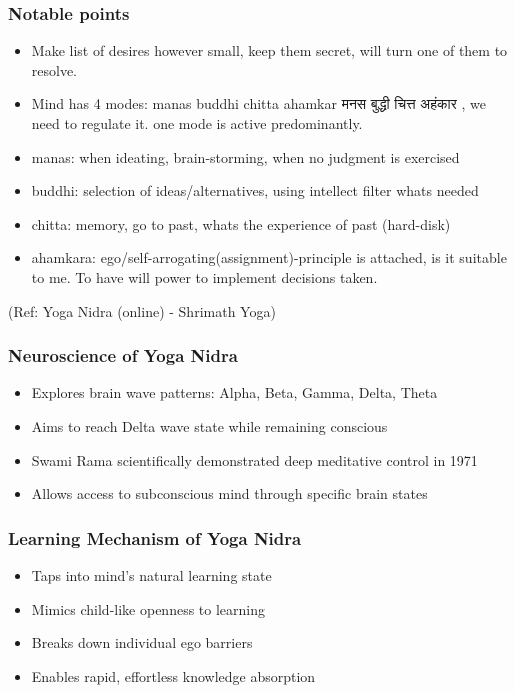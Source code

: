 \begin{frame}[fragile]\frametitle{Notable points}
    \begin{itemize}
        \item Make list of desires however small, keep them secret, will turn one of them to resolve.
		\item Mind has 4 modes: manas buddhi chitta ahamkar मनस बुद्धी चित्त अहंकार , we need to regulate it. one mode is active predominantly.
		\item manas: when ideating, brain-storming, when no judgment is exercised
		\item buddhi: selection of ideas/alternatives, using intellect filter whats needed
		\item chitta: memory, go to past, whats the experience of past (hard-disk)
		\item ahamkara: ego/self-arrogating(assignment)-principle is attached, is it suitable to me. To have will power to implement decisions taken.
    \end{itemize}
	
	{\tiny (Ref: Yoga Nidra (online) - Shrimath Yoga)}

\end{frame}

\begin{frame}[fragile]\frametitle{Neuroscience of Yoga Nidra}
    \begin{itemize}
        \item Explores brain wave patterns: Alpha, Beta, Gamma, Delta, Theta
        \item Aims to reach Delta wave state while remaining conscious
        \item Swami Rama scientifically demonstrated deep meditative control in 1971
        \item Allows access to subconscious mind through specific brain states
    \end{itemize}
\end{frame}

\begin{frame}[fragile]\frametitle{Learning Mechanism of Yoga Nidra}
    \begin{itemize}
        \item Taps into mind's natural learning state
        \item Mimics child-like openness to learning
        \item Breaks down individual ego barriers
        \item Enables rapid, effortless knowledge absorption
    \end{itemize}
\end{frame}

